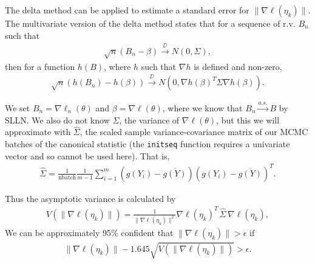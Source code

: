 The delta method can be applied to estimate a standard error for $\lVert \nabla \ell
( \eta_k ) \rVert$. 
The multivariate version of the delta method states that for a sequence of r.v. $B_n$ 
such that
\begin{align*}
	\sqrt{n} ( B_n - \beta) \stackrel{\DD}{\longrightarrow} N( 0, \Sigma ),
\end{align*}
then for a function $h(B)$, where $h$ such that $\nabla h$ is defined and non-zero,
\begin{align*}
	\sqrt{n} \left ( h(B_n) - h(\beta) \right ) \stackrel{\DD}{\longrightarrow} N 
\left ( 0, \nabla h( \beta)^T \Sigma\nabla h( \beta)  \right ).
\end{align*}

We set $B_n = \nabla \ell_n( \theta)$ and $\beta =\nabla \ell( \theta)$, where we 
know that $B_n \stackrel{a.s.}{\longrightarrow} B$ by SLLN.  
We also do not know $\Sigma$, the variance of $\nabla \ell( \theta)$, but this we will 
approximate with $
\hat{\Sigma}$, the scaled sample variance-covariance matrix of our MCMC batches of 
the canonical statistic (the \texttt{initseq} function 
requires a univariate vector and so cannot be used here).  That is,
\begin{align*}
	\hat{\Sigma} = \frac{1}{\text{nbatch}}\frac{1}{m-1}\sum_{i=1}^{m} (g(Y_i) - \overline{g
(Y)})( g(Y_i) - 
\overline{g(Y)})^T.
\end{align*}

Thus the asymptotic variance is calculated by
\begin{align*}
	V \left( \lVert \nabla \ell( \eta_k ) \rVert \right )= \frac{1}{\lVert \nabla \ell
( \eta_k ) \rVert^2} \nabla \ell
( \eta_k )^T \, \hat{\Sigma} \,  \nabla \ell( \eta_k ),
\end{align*}%
We can be approximately 95\% confident that $\lVert 
\nabla \ell( \eta_k ) \rVert > \epsilon$ if 
\begin{align*}
	\lVert \nabla \ell( \eta_k ) \rVert - 1.645 \sqrt{ V \left( \lVert \nabla \ell
( \eta_k ) \rVert \right )} > 
\epsilon.
\end{align*}

